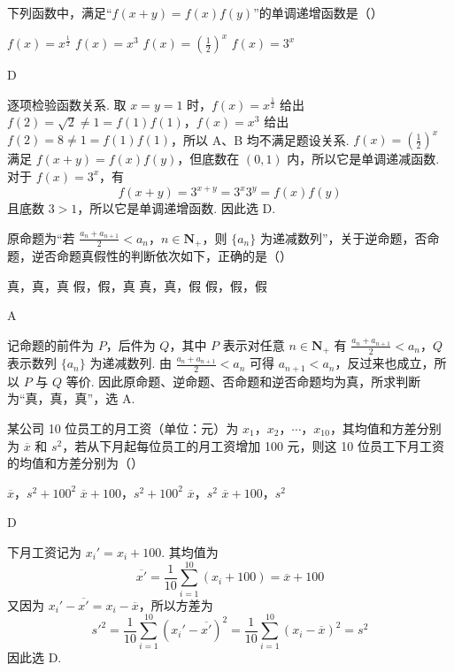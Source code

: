 \begin{problem}
下列函数中，满足“\(f(x + y) = f(x)f(y)\)”的单调递增函数是（\quad）

\choices
    {\(f(x) = x^{\frac{1}{2}}\)}
    {\(f(x) = x^{3}\)}
    {\(f(x) = \left(\frac{1}{2}\right)^x\)}
    {\(f(x) = 3^{x}\)}
\begin{answer}
D
\end{answer}
\begin{solution}
逐项检验函数关系. 取 \(x=y=1\) 时，\(f(x)=x^{\frac{1}{2}}\) 给出 \(f(2)=\sqrt2\ne1=f(1)f(1)\)，\(f(x)=x^3\) 给出 \(f(2)=8\ne1=f(1)f(1)\)，所以 A、B 均不满足题设关系. \(f(x)=(\frac12)^x\) 满足 \(f(x+y)=f(x)f(y)\)，但底数在 \((0,1)\) 内，所以它是单调递减函数. 对于 \(f(x)=3^x\)，有
\[
f(x+y)=3^{x+y}=3^x3^y=f(x)f(y)
\]
且底数 \(3>1\)，所以它是单调递增函数. 因此选 D.
\end{solution}
\end{problem}

\begin{problem}
原命题为“若 \(\frac{a_n + a_{n+1}}{2} < a_n\)，\(n \in \mathbf{N}_+\)，则 \(\{a_n\}\) 为递减数列”，关于逆命题，否命题，逆否命题真假性的判断依次如下，正确的是（\quad）

\choices
    {真，真，真}
    {假，假，真}
    {真，真，假}
    {假，假，假}
\begin{answer}
A
\end{answer}
\begin{solution}
记命题的前件为 \(P\)，后件为 \(Q\)，其中 \(P\) 表示对任意 \(n\in\mathbf N_+\) 有 \(\frac{a_n+a_{n+1}}2<a_n\)，\(Q\) 表示数列 \(\{a_n\}\) 为递减数列. 由 \(\frac{a_n+a_{n+1}}2<a_n\) 可得 \(a_{n+1}<a_n\)，反过来也成立，所以 \(P\) 与 \(Q\) 等价. 因此原命题、逆命题、否命题和逆否命题均为真，所求判断为“真，真，真”，选 A.
\end{solution}
\end{problem}

\begin{problem}
某公司 10 位员工的月工资（单位：元）为 \(x_{1}\)，\(x_{2}\)，\(\cdots\)，\(x_{10}\)，其均值和方差分别为 \(\overline{x}\) 和 \(s^{2}\)，若从下月起每位员工的月工资增加 100 元，则这 10 位员工下月工资的均值和方差分别为（\quad）

\choices
    {\(\overline{x}\)，\(s^2 + 100^2\)}
    {\(\overline{x} + 100\)，\(s^2 + 100^2\)}
    {\(\overline{x}\)，\(s^2\)}
    {\(\overline{x} + 100\)，\(s^2\)}
\begin{answer}
D
\end{answer}
\begin{solution}
下月工资记为 \(x_i'=x_i+100\). 其均值为
\[
\overline{x'}=\frac1{10}\sum_{i=1}^{10}(x_i+100)=\overline{x}+100
\]
又因为 \(x_i'-\overline{x'}=x_i-\overline{x}\)，所以方差为
\[
s'^2=\frac1{10}\sum_{i=1}^{10}(x_i'-\overline{x'})^2
=\frac1{10}\sum_{i=1}^{10}(x_i-\overline{x})^2=s^2
\]
因此选 D.
\end{solution}
\end{problem}


